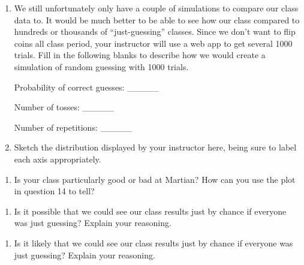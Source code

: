 \documentclass[
]{article}
\providecommand{\tightlist}{%
  \setlength{\itemsep}{0pt}\setlength{\parskip}{0pt}}
\begin{document}
\vspace{1in}

\begin{enumerate}
\def\labelenumi{\arabic{enumi}.}
\setcounter{enumi}{12}
\item
  We still unfortunately only have a couple of simulations to compare
  our class data to. It would be much better to be able to see how our
  class compared to hundreds or thousands of ``just-guessing'' classes.
  Since we don't want to flip coins all class period, your instructor
  will use a web app to get several 1000 trials. Fill in the following
  blanks to describe how we would create a simulation of random guessing
  with 1000 trials. \vspace{0.1in}

  Probability of correct guesses: \_\_\_\_\_ \vspace{0.1in}

  Number of tosses: \_\_\_\_\_ \vspace{0.1in}

  Number of repetitions: \_\_\_\_\_ \vspace{0.1in}
\item
  Sketch the distribution displayed by your instructor here, being sure
  to label each axis appropriately.
\end{enumerate}

\vspace{1.5in}

\begin{enumerate}
\def\labelenumi{\arabic{enumi}.}
\setcounter{enumi}{14}
\tightlist
\item
  Is your class particularly good or bad at Martian? How can you use the
  plot in question 14 to tell?
\end{enumerate}

\vspace{1in}

\begin{enumerate}
\def\labelenumi{\arabic{enumi}.}
\setcounter{enumi}{15}
\tightlist
\item
  Is it possible that we could see our class results just by chance if
  everyone was just guessing? Explain your reasoning.
\end{enumerate}

\vspace{1in}

\begin{enumerate}
\def\labelenumi{\arabic{enumi}.}
\setcounter{enumi}{16}
\tightlist
\item
  Is it likely that we could see our class results just by chance if
  everyone was just guessing? Explain your reasoning.
\end{enumerate}
\end{document}
